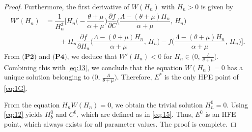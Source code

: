 \documentclass[10pt,a4paper]{amsart}
\begin{document}
\begin{proof}
Furthermore, the first derivative of $W(H_n)$ with $H_n>0$ is given by
\begin{equation*}
\begin{split}
   W'(H_n) &= \dfrac{1}{H_n^2}\bigg[H_n\bigg(-\dfrac{\theta + \mu}{\alpha + \mu}\bigg)\dfrac{\partial f}{\partial C}\bigg(\dfrac{\Lambda - (\theta + \mu)H_n}{\alpha + \mu},\,H_n\bigg)\\
    &\qquad+ H_n\dfrac{\partial f}{\partial H_n}\bigg(\dfrac{\Lambda - (\theta + \mu)H_n}{\alpha + \mu},\,H_n\bigg) - f\bigg(\dfrac{\Lambda - (\theta + \mu)H_n}{\alpha + \mu},\,H_n\bigg)\bigg].
\end{split}
\end{equation*}
From $\textbf{(P2)}$ and $\textbf{(P4)}$, we deduce that $W'(H_n) < 0$ for $H_n \in \big(0,\,\frac{\Lambda}{\theta + \mu}\big)$. 
Combining this with \eqref{eq:13}, we conclude that the equation $W(H_n) = 0$  has a unique solution belonging to $\big(0,\,\frac{\Lambda}{\theta + \mu}\big)$. 
Therefore, $E^*$ is the only HPE point of \eqref{eq:1G}.

From the equation $H_nW(H_n) = 0$, we obtain the trivial solution $H_n^0 = 0$. 
Using \eqref{eq:12} yields $H_b^0$ and $C^0$, which are defined as in  \eqref{eq:15}. 
Thus, $E^0$ is an HFE point, which always exists for all parameter values. 
The proof is complete.
\end{proof}
\end{document}
